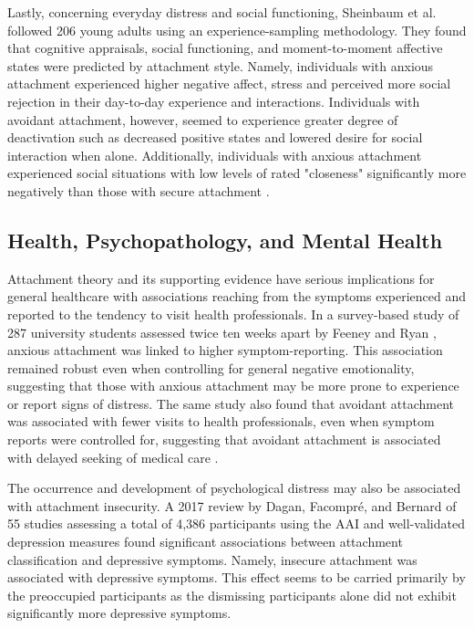 \documentclass[12pt]{report}
\begin{document}
Lastly, concerning everyday distress and social functioning, Sheinbaum et al. \cite{Sheinbaum2015} followed 206 young adults using an experience-sampling methodology.
They found that cognitive appraisals, social functioning, and moment-to-moment affective states were predicted by attachment style.
Namely, individuals with anxious attachment experienced higher negative affect, stress and perceived more social rejection in their day-to-day experience and interactions. Individuals with avoidant attachment, however, seemed to experience greater degree of deactivation such as decreased positive states and lowered desire for social interaction when alone.
Additionally, individuals with anxious attachment experienced social situations with low levels of rated "closeness" significantly more negatively than those with secure attachment \cite{Sheinbaum2015}.

\subsection{Health, Psychopathology, and Mental Health}
Attachment theory and its supporting evidence have serious implications for general healthcare with associations reaching from the symptoms experienced and reported to the tendency to visit health professionals.
In a survey-based study of 287 university students assessed twice ten weeks apart by Feeney and Ryan \cite{Feeney1994}, anxious attachment was linked to higher symptom-reporting. This association remained robust even when controlling for general negative emotionality, suggesting that those with anxious attachment may be more prone to experience or report signs of distress.
The same study also found that avoidant attachment was associated with fewer visits to health professionals, even when symptom reports were controlled for, suggesting that avoidant attachment is associated with delayed seeking of medical care \cite{Feeney1994}.

The occurrence and development of psychological distress may also be associated with attachment insecurity. A 2017 review by Dagan, Facompré, and Bernard \cite{Dagan2018} of 55 studies assessing a total of 4,386 participants using the AAI and well-validated depression measures found significant associations between attachment classification and depressive symptoms.
Namely, insecure attachment was associated with depressive symptoms. This effect seems to be carried primarily by the preoccupied participants as the dismissing participants alone did not exhibit significantly more depressive symptoms.
\end{document}
